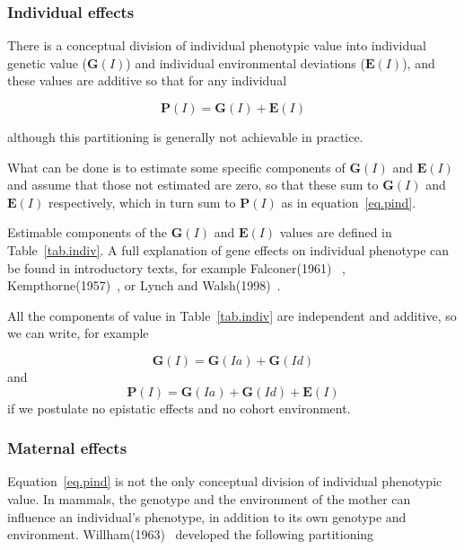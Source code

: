 \documentclass[titlepage]{article}  %
\begin{document}
\subsubsection{Individual effects}
There is a conceptual division of individual phenotypic value into individual genetic value (${\bm G(I)}$) and individual environmental deviations (${\bm E(I)}$), and these values are additive so that for any individual

\begin{equation}
{\bm P(I) = \bm G(I) + \bm E(I)}    \label{eq.pind} 
\end{equation}

although this partitioning is generally not achievable in practice. 

What can be done is to estimate some specific components of ${\bm G(I)}$ and ${\bm E(I)}$ and assume that those not estimated are zero, so that these sum to ${\bm G(I)}$ and ${\bm E(I)}$ respectively, which in turn sum to ${\bm P(I)}$ as in equation~\ref{eq.pind}.

Estimable components of the ${\bm G(I)}$ and ${\bm E(I)}$ values are defined in Table~\ref{tab.indiv}. A full explanation of gene effects on individual phenotype can be found in introductory texts, for example Falconer(1961)~\cite{falc:61} , Kempthorne(1957)~\cite{kemp:57}, or Lynch and Walsh(1998)~\cite{lync:98}.



All the components of value in Table~\ref{tab.indiv} are independent and additive, so we can write, for example

\begin{displaymath}
{\bm G(I) = \bm G(Ia) + \bm G(Id)}    
\end{displaymath}
and
\begin{displaymath}
{\bm P(I) = \bm G(Ia) + \bm G(Id) + \bm E(I)}    
\end{displaymath}
if we postulate no epistatic effects and no cohort environment.

\subsubsection{Maternal effects}
Equation~\ref{eq.pind} is not the only conceptual division of individual phenotypic value. In mammals, the genotype and the environment of the mother can influence an individual's phenotype, in addition to its own genotype and environment. Willham(1963)~\cite{will:63} developed the following partitioning
\end{document}
